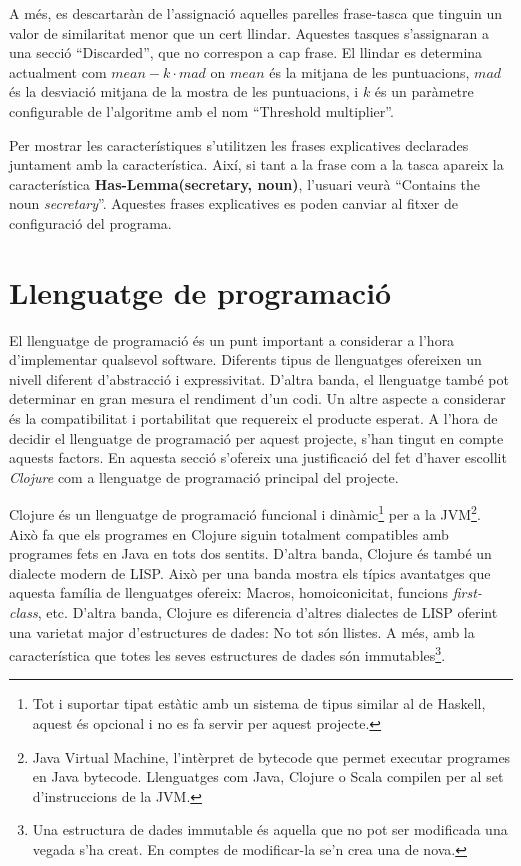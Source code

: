 A més, es descartaràn de l'assignació aquelles parelles frase-tasca que tinguin un valor de similaritat menor que un cert llindar. Aquestes tasques s'assignaran a una secció ``Discarded'', que no correspon a cap frase. El llindar es determina actualment com $mean - k\cdot mad$ on $mean$ és la mitjana de les puntuacions, $mad$ és la desviació mitjana de la mostra de les puntuacions, i $k$ és un paràmetre configurable de l'algoritme amb el nom ``Threshold multiplier''.

Per mostrar les característiques s'utilitzen les frases explicatives declarades juntament amb la característica. Així, si tant a la frase com a la tasca apareix la característica \textbf{Has-Lemma(secretary, noun)}, l'usuari veurà ``Contains the noun \emph{secretary}''. Aquestes frases explicatives es poden canviar al fitxer de configuració del programa.







\section{Llenguatge de programació}
\label{sec:implementacio-llenguatge}
El llenguatge de programació és un punt important a considerar a l'hora d'implementar qualsevol software. Diferents tipus de llenguatges ofereixen un nivell diferent d'abstracció i expressivitat. D'altra banda, el llenguatge també pot determinar en gran mesura el rendiment d'un codi. Un altre aspecte a considerar és la compatibilitat i portabilitat que requereix el producte esperat. A l'hora de decidir el llenguatge de programació per aquest projecte, s'han tingut en compte aquests factors. En aquesta secció s'ofereix una justificació del fet d'haver escollit \emph{Clojure} com a llenguatge de programació principal del projecte.

Clojure és un llenguatge de programació funcional i dinàmic\footnote{Tot i suportar tipat estàtic amb un sistema de tipus similar al de Haskell, aquest és opcional i no es fa servir per aquest projecte.} per a la JVM\footnote{Java Virtual Machine, l'intèrpret de bytecode que permet executar programes en Java bytecode. Llenguatges com Java, Clojure o Scala compilen per al set d'instruccions de la JVM.}. Això fa que els programes en Clojure siguin totalment compatibles amb programes fets en Java en tots dos sentits. D'altra banda, Clojure és també un dialecte modern de LISP. Això per una banda mostra els típics avantatges que aquesta família de llenguatges ofereix: Macros, homoiconicitat, funcions \emph{first-class}, etc. D'altra banda, Clojure es diferencia d'altres dialectes de LISP oferint una varietat major d'estructures de dades: No tot són llistes. A més, amb la característica que totes les seves estructures de dades són immutables\footnote{Una estructura de dades immutable és aquella que no pot ser modificada una vegada s'ha creat. En comptes de modificar-la se'n crea una de nova.}. 

